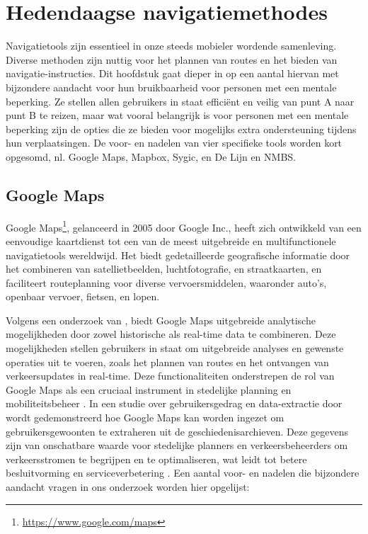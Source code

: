 \section{Hedendaagse navigatiemethodes}
\label{sec:hedendaagse-navigatiemethodes}


Navigatietools zijn essentieel in onze steeds mobieler wordende samenleving. Diverse methoden zijn nuttig voor het plannen van routes en het bieden van navigatie-instructies. Dit hoofdstuk gaat dieper in op een aantal hiervan met bijzondere aandacht voor hun bruikbaarheid voor personen met een mentale beperking.  Ze stellen allen gebruikers in staat efficiënt en veilig van punt A naar punt B te reizen, maar wat vooral belangrijk is voor personen met een mentale beperking zijn de opties die ze bieden voor mogelijks extra ondersteuning tijdens hun verplaatsingen. De voor- en nadelen van vier specifieke tools worden kort opgesomd, nl. Google Maps, Mapbox, Sygic, en De Lijn en NMBS.

\subsection{Google Maps}
\label{sec:google-maps}
Google Maps\footnote{\url{https://www.google.com/maps}}, gelanceerd in 2005 door Google Inc., heeft zich ontwikkeld van een eenvoudige kaartdienst tot een van de meest uitgebreide en multifunctionele navigatietools wereldwijd. Het biedt gedetailleerde geografische informatie door het combineren van satellietbeelden, luchtfotografie, en straatkaarten, en faciliteert routeplanning voor diverse vervoersmiddelen, waaronder auto's, openbaar vervoer, fietsen, en lopen. 

Volgens een onderzoek van \textcite{Mehta2019}, biedt Google Maps uitgebreide analytische mogelijkheden door zowel historische als real-time data te combineren. Deze mogelijkheden stellen gebruikers in staat om uitgebreide analyses en gewenste operaties uit te voeren, zoals het plannen van routes en het ontvangen van verkeersupdates in real-time. Deze functionaliteiten onderstrepen de rol van Google Maps als een cruciaal instrument in stedelijke planning en mobiliteitsbeheer \autocite{Mehta2019}. In een studie over gebruikersgedrag en data-extractie door \textcite{Sardianos2018} wordt gedemonstreerd hoe Google Maps kan worden ingezet om gebruikersgewoonten te extraheren uit de geschiedenisarchieven. Deze gegevens zijn van onschatbare waarde voor stedelijke planners en verkeersbeheerders om verkeersstromen te begrijpen en te optimaliseren, wat leidt tot betere besluitvorming en serviceverbetering \autocite{Sardianos2018}. Een aantal voor- en nadelen die bijzondere aandacht vragen in ons onderzoek worden hier opgelijst:

